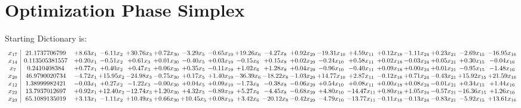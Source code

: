 \documentclass[9pt]{article}
\begin{document}
\section{Optimization Phase Simplex}
Starting Dictionary is:
\[\begin{array}{c| c c@{\hskip 2pt} c@{\hskip 2pt} c@{\hskip 2pt} c@{\hskip 2pt} c@{\hskip 2pt} c@{\hskip 2pt} c@{\hskip 2pt} c@{\hskip 2pt} c@{\hskip 2pt} c@{\hskip 2pt} c@{\hskip 2pt} c@{\hskip 2pt} c@{\hskip 2pt} c@{\hskip 2pt} c@{\hskip 2pt} c@{\hskip 2pt} }
 x_{17}   &  21.1737706799 & +  8.63 x_{1} & -6.11 x_{2} & + 30.76 x_{3} & +  0.72 x_{30} & -3.29 x_{5} & -0.65 x_{19} & + 19.26 x_{6} & -4.27 x_{8} & +  0.92 x_{29} & -19.31 x_{10} & +  4.59 x_{11} & +  0.12 x_{18} & -1.11 x_{24} & +  0.23 x_{21} & -2.69 x_{15} & -16.95 x_{16}\\
 x_{14}   &  0.113505381557 & +  0.20 x_{1} & -0.51 x_{2} & +  0.61 x_{3} & +  0.01 x_{30} & -0.40 x_{5} & +  0.03 x_{19} & -0.15 x_{6} & +  0.15 x_{8} & +  0.02 x_{29} & -0.24 x_{10} & +  0.58 x_{11} & +  0.02 x_{18} & -0.03 x_{24} & +  0.05 x_{21} & +  0.30 x_{15} & -0.04 x_{16}\\
 x_{7}   &  0.2410408384 & +  0.77 x_{1} & +  0.40 x_{2} & +  0.47 x_{3} & +  0.06 x_{30} & +  0.35 x_{5} & -0.11 x_{19} & +  1.02 x_{6} & +  1.28 x_{8} & +  0.04 x_{29} & -0.96 x_{10} & -0.40 x_{11} & +  0.09 x_{18} & +  0.00 x_{24} & +  0.01 x_{21} & -0.95 x_{15} & -1.48 x_{16}\\
 x_{20}   &  46.9790020734 & -4.72 x_{1} & + 15.95 x_{2} & -24.98 x_{3} & -0.75 x_{30} & +  0.17 x_{5} & +  1.40 x_{19} & -36.39 x_{6} & -18.22 x_{8} & -1.03 x_{29} & + 14.77 x_{10} & +  2.87 x_{11} & -0.12 x_{18} & +  0.71 x_{24} & -0.43 x_{21} & + 15.92 x_{15} & + 21.59 x_{16}\\
 x_{12}   &  1.38999982421 & -0.03 x_{1} & +  0.27 x_{2} & -1.22 x_{3} & -0.00 x_{30} & +  0.04 x_{5} & +  0.09 x_{19} & -1.73 x_{6} & -0.38 x_{8} & -0.06 x_{29} & +  0.54 x_{10} & +  0.08 x_{11} & +  0.00 x_{18} & +  0.08 x_{24} & -0.01 x_{21} & +  0.34 x_{15} & +  1.44 x_{16}\\
 x_{22}   &  13.7937012697 & +  0.92 x_{1} & + 12.40 x_{2} & -12.74 x_{3} & +  1.20 x_{30} & +  4.32 x_{5} & -0.89 x_{19} & +  5.27 x_{6} & -4.45 x_{8} & -0.68 x_{29} & +  4.80 x_{10} & -14.47 x_{11} & +  0.80 x_{18} & +  1.05 x_{24} & -0.57 x_{21} & -16.36 x_{15} & +  1.26 x_{16}\\
 x_{23}   &  65.1089135019 & +  3.13 x_{1} & -1.11 x_{2} & + 10.49 x_{3} & +  0.66 x_{30} & + 10.45 x_{5} & +  0.08 x_{19} & +  3.42 x_{6} & -20.12 x_{8} & -0.42 x_{29} & -4.79 x_{10} & -13.77 x_{11} & -0.11 x_{18} & -0.13 x_{24} & -0.83 x_{21} & -5.92 x_{15} & + 13.61 x_{16}\\

\end{array}\]
\end{document}

